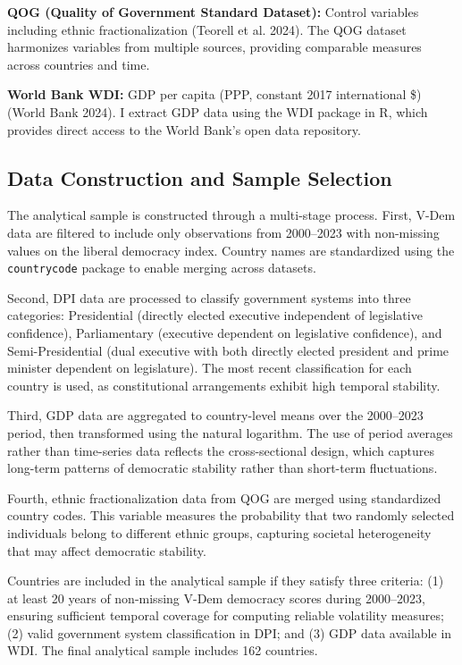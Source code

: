 \documentclass[
  letterpaper,
  DIV=11,
  numbers=noendperiod]{scrartcl}
\begin{document}
\textbf{QOG (Quality of Government Standard Dataset):} Control variables
including ethnic fractionalization (Teorell et al. 2024). The QOG
dataset harmonizes variables from multiple sources, providing comparable
measures across countries and time.

\textbf{World Bank WDI:} GDP per capita (PPP, constant 2017
international \$) (World Bank 2024). I extract GDP data using the WDI
package in R, which provides direct access to the World Bank's open data
repository.

\subsection{Data Construction and Sample
Selection}\label{data-construction-and-sample-selection}

The analytical sample is constructed through a multi-stage process.
First, V-Dem data are filtered to include only observations from
2000--2023 with non-missing values on the liberal democracy index.
Country names are standardized using the \texttt{countrycode} package to
enable merging across datasets.

Second, DPI data are processed to classify government systems into three
categories: Presidential (directly elected executive independent of
legislative confidence), Parliamentary (executive dependent on
legislative confidence), and Semi-Presidential (dual executive with both
directly elected president and prime minister dependent on legislature).
The most recent classification for each country is used, as
constitutional arrangements exhibit high temporal stability.

Third, GDP data are aggregated to country-level means over the
2000--2023 period, then transformed using the natural logarithm. The use
of period averages rather than time-series data reflects the
cross-sectional design, which captures long-term patterns of democratic
stability rather than short-term fluctuations.

Fourth, ethnic fractionalization data from QOG are merged using
standardized country codes. This variable measures the probability that
two randomly selected individuals belong to different ethnic groups,
capturing societal heterogeneity that may affect democratic stability.

Countries are included in the analytical sample if they satisfy three
criteria: (1) at least 20 years of non-missing V-Dem democracy scores
during 2000--2023, ensuring sufficient temporal coverage for computing
reliable volatility measures; (2) valid government system classification
in DPI; and (3) GDP data available in WDI. The final analytical sample
includes 162 countries.
\end{document}
